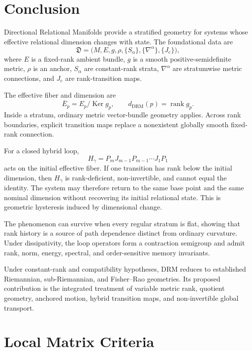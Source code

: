 \documentclass[11pt]{article}
\newcommand{\Ker}{\operatorname{Ker}}
\newcommand{\rank}{\operatorname{rank}}
\begin{document}
\section{Conclusion}

Directional Relational Manifolds provide a stratified geometry for systems
whose effective relational dimension changes with state. The foundational
data are
\[
\mathfrak D=
\bigl(M,E,g,\rho,\{S_\alpha\},\{\nabla^\alpha\},\{J_e\}\bigr),
\]
where $E$ is a fixed-rank ambient bundle, $g$ is a smooth
positive-semidefinite metric, $\rho$ is an anchor, $S_\alpha$ are
constant-rank strata, $\nabla^\alpha$ are stratumwise metric connections, and
$J_e$ are rank-transition maps.

The effective fiber and dimension are
\[
\overline E_p=E_p/\Ker g_p,
\qquad
d_{\mathrm{DRM}}(p)=\rank g_p.
\]
Inside a stratum, ordinary metric vector-bundle geometry applies. Across rank
boundaries, explicit transition maps replace a nonexistent globally smooth
fixed-rank connection.

For a closed hybrid loop,
\[
H_\gamma=P_mJ_{m-1}P_{m-1}\cdots J_1P_1
\]
acts on the initial effective fiber. If one transition has rank below the
initial dimension, then $H_\gamma$ is rank-deficient, non-invertible, and
cannot equal the identity. The system may therefore return to the same base
point and the same nominal dimension without recovering its initial
relational state. This is geometric hysteresis induced by dimensional change.

The phenomenon can survive when every regular stratum is flat, showing that
rank history is a source of path dependence distinct from ordinary curvature.
Under dissipativity, the loop operators form a contraction semigroup and admit
rank, norm, energy, spectral, and order-sensitive memory invariants.

Under constant-rank and compatibility hypotheses, DRM reduces to established
Riemannian, sub-Riemannian, and Fisher--Rao geometries. Its proposed
contribution is the integrated treatment of variable metric rank, quotient
geometry, anchored motion, hybrid transition maps, and non-invertible global
transport.

\appendix

\section{Local Matrix Criteria}
\end{document}
